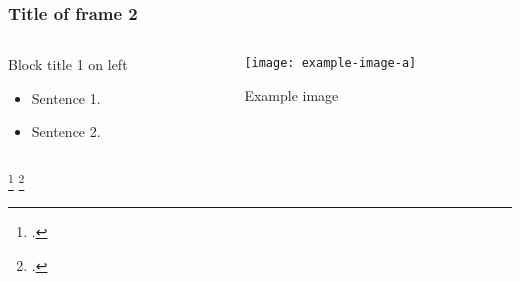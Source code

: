 \documentclass[10pt,ignorenonframetext]{beamer}
\begin{document}
\begin{frame}
\frametitle{Title of frame 2}

\begin{columns}[T]
\begin{column}{0.45\textwidth}
\begin{block}{Block title 1 on left}

\begin{itemize}
\item Sentence 1.\footnotemark[1] 
\item Sentence 2.\footnotemark[2]
\end{itemize}

\end{block}
\end{column}

\begin{column}{0.45\textwidth}
\begin{figure}
\texttt{[image: example-image-a]}
\caption{Example image}
\end{figure}
\end{column}
\end{columns}

\setcounter{footnote}{1}
\footcitetext{dijkstra1959note}
\footcitetext{zipf1946p1}

\end{frame}
\end{document}
